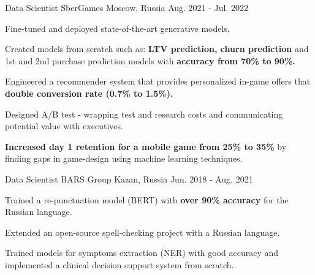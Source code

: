 \begin{cventries}
\cventry
  {Data Scientist} %
  {SberGames} %
  {Moscow, Russia} %
  {Aug. 2021 - Jul. 2022} %
  {
    \begin{cvitems} %
      \item {Fine-tuned and deployed state-of-the-art generative models.}
      \item {Created models from scratch such as: \textbf{LTV prediction, churn prediction} and 1st and 2nd purchase prediction models with  \textbf{accuracy from 70\% to 90\%.}}
      \item {Engineered a recommender system that provides personalized in-game offers that \textbf{double conversion rate (0.7\% to 1.5\%).}}
      \item {Designed A/B test - wrapping test and research costs and communicating potential value with executives.}
      \item {\textbf{Increased day 1 retention for a mobile game from 25\% to 35\%} by finding gaps in game-design using machine learning techniques.}
    \end{cvitems}
  }

\cventry
{Data Scientist} %
{BARS Group} %
{Kazan, Russia} %
{Jun. 2018 - Aug. 2021} %
{
  \begin{cvitems} %
    \item {Trained a re-punctuation model (BERT) with \textbf{over 90\% accuracy} for the Russian language.}
    \item {Extended an open-source spell-checking project with a Russian language.}
    \item {Trained models for symptoms extraction (NER) with good accuracy and implemented a clinical decision support system from scratch..}
  \end{cvitems}
}


\end{cventries}
